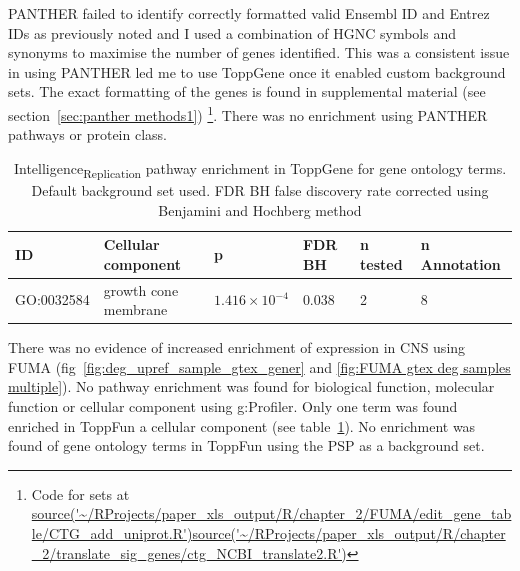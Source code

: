 PANTHER failed to identify correctly formatted valid Ensembl ID and Entrez IDs as previously noted and I used a combination of HGNC symbols and synonyms to maximise the number of genes identified. This was a consistent issue in using PANTHER led me to use ToppGene once it enabled custom background sets. The exact formatting of the genes is found in supplemental material (see section~\ref{sec:panther methods1})%
\footnote{Code for sets at \url{source('~/RProjects/paper_xls_output/R/chapter_2/FUMA/edit_gene_table/CTG_add_uniprot.R')}\url{source('~/RProjects/paper_xls_output/R/chapter_2/translate_sig_genes/ctg_NCBI_translate2.R')}}. There was no enrichment using PANTHER pathways or protein class. 

\begin{table}[]
    \centering
        \setlength{\extrarowheight}{2pt}
    \begin{tabular}{llllll}
    \toprule
    ID & 	Cellular component &	 	p& 	FDR BH &	n tested & 	n Annotation\\ 
    \midrule
    GO:0032584 &	growth cone membrane &		$1.416\times10^{-4}$&0.038 	&	2& 	8       \\
        \bottomrule
    \end{tabular}
    \caption{Intelligence\textsubscript{Replication} pathway enrichment in ToppGene for gene ontology terms. Default background set used. FDR BH false discovery rate corrected using Benjamini and Hochberg method}
    \label{tab:toppgene ctg cc}
\end{table}

There was no evidence of increased enrichment of expression in CNS using FUMA (fig~\ref{fig:deg_upref_sample_gtex_gener} and \ref{fig:FUMA gtex deg samples multiple}). No pathway enrichment was found for biological function, molecular function or cellular component using g:Profiler. Only one term was found enriched in ToppFun a  cellular component (see table~\ref{tab:toppgene ctg cc}). No enrichment was found of gene ontology terms in ToppFun using the PSP as a background set.



 

        
